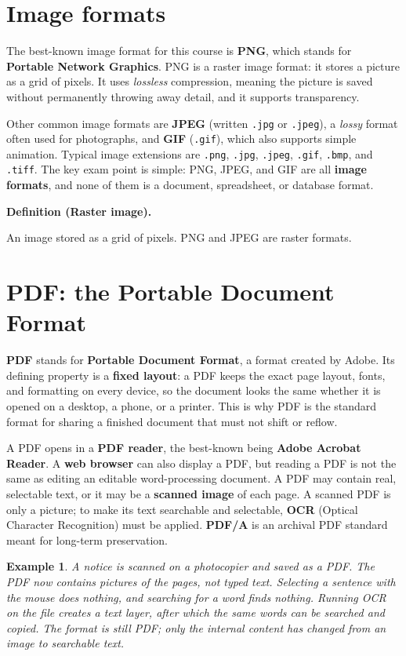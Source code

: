 \documentclass[11pt]{article}
\newtheorem{example}{Example}[section]
\newenvironment{definitionbox}[1]{%
  \par\noindent\textbf{Definition (#1).}\ \itshape
}{\par\vspace{0.3em}}
\begin{document}
\section{Image formats}
The best-known image format for this course is \textbf{PNG}, which stands for
\textbf{Portable Network Graphics}. PNG is a raster image format: it stores a
picture as a grid of pixels. It uses \emph{lossless} compression, meaning the
picture is saved without permanently throwing away detail, and it supports
transparency.

Other common image formats are \textbf{JPEG} (written \texttt{.jpg} or
\texttt{.jpeg}), a \emph{lossy} format often used for photographs, and
\textbf{GIF} (\texttt{.gif}), which also supports simple animation. Typical
image extensions are \texttt{.png}, \texttt{.jpg}, \texttt{.jpeg},
\texttt{.gif}, \texttt{.bmp}, and \texttt{.tiff}. The key exam point is
simple: PNG, JPEG, and GIF are all \textbf{image formats}, and none of them
is a document, spreadsheet, or database format.

\begin{definitionbox}{Raster image}
An image stored as a grid of pixels. PNG and JPEG are raster formats.
\end{definitionbox}

\section{PDF: the Portable Document Format}
\textbf{PDF} stands for \textbf{Portable Document Format}, a format created
by Adobe. Its defining property is a \textbf{fixed layout}: a PDF keeps the
exact page layout, fonts, and formatting on every device, so the document
looks the same whether it is opened on a desktop, a phone, or a printer. This
is why PDF is the standard format for sharing a finished document that must
not shift or reflow.

A PDF opens in a \textbf{PDF reader}, the best-known being \textbf{Adobe
Acrobat Reader}. A \textbf{web browser} can also display a PDF, but reading a
PDF is not the same as editing an editable word-processing document. A PDF
may contain real, selectable text, or it may be a \textbf{scanned image} of
each page. A scanned PDF is only a picture; to make its text searchable and
selectable, \textbf{OCR} (Optical Character Recognition) must be applied.
\textbf{PDF/A} is an archival PDF standard meant for long-term preservation.

\begin{example}
A notice is scanned on a photocopier and saved as a PDF. The PDF now contains
pictures of the pages, not typed text. Selecting a sentence with the mouse
does nothing, and searching for a word finds nothing. Running OCR on the file
creates a text layer, after which the same words can be searched and copied.
The format is still PDF; only the internal content has changed from an image
to searchable text.
\end{example}
\end{document}

